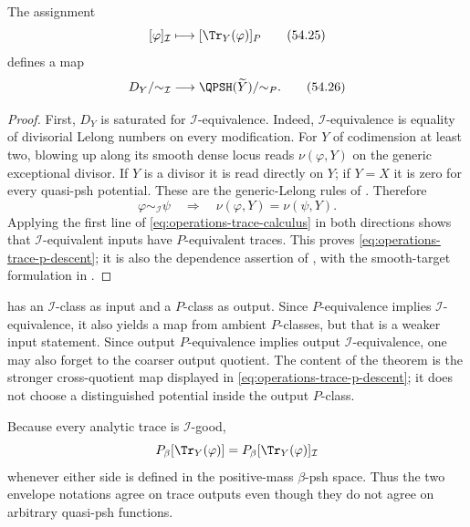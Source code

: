 \begin{theorem}\label{thm:operations-trace-p-descent}
The assignment
\[
 [\varphi]_{\mathcal I}\longmapsto
 [\Tr_Y(\varphi)]_P
\tag{54.25}\label{eq:operations-trace-p-map}
\]
defines a map
\[
 D_Y/{\sim_{\mathcal I}}
 \longrightarrow
 \QPSH(\widetilde Y)/{\sim_P}.
\tag{54.26}\label{eq:operations-trace-p-descent}
\]
\end{theorem}

\begin{proof}
First, $D_Y$ is saturated for $\mathcal I$-equivalence.  Indeed,
$\mathcal I$-equivalence is equality of divisorial Lelong numbers on
every modification.  For $Y$ of codimension at least two, blowing up
along its smooth dense locus reads $\nu(\varphi,Y)$ on the generic
exceptional divisor.  If $Y$ is a divisor it is read directly on $Y$;
if $Y=X$ it is zero for every quasi-psh potential.
These are the generic-Lelong rules of
.  Therefore
\[
 \varphi\sim_{\mathcal I}\psi
 \quad\Longrightarrow\quad
 \nu(\varphi,Y)=\nu(\psi,Y).
\tag{54.27}\label{eq:operations-domain-saturated}
\]
Applying the first line of \eqref{eq:operations-trace-calculus} in both
directions shows that $\mathcal I$-equivalent inputs have
$P$-equivalent traces.  This proves
\eqref{eq:operations-trace-p-descent}; it is also the dependence assertion
of \cite[Proposition~8.2.1]{XiaBook}, with the smooth-target
formulation in \cite[Lemma~3.9(i)]{DXTraceV2}.
\end{proof}

\begin{remark}
\label{rem:operations-trace-p-boundary}
 has an
$\mathcal I$-class as input and a $P$-class as output.  Since
$P$-equivalence implies $\mathcal I$-equivalence, it also yields a map
from ambient $P$-classes, but that is a weaker input statement.  Since
output $P$-equivalence implies output $\mathcal I$-equivalence, one may
also forget to the coarser output quotient.  The content of the theorem is
the stronger cross-quotient map displayed in
\eqref{eq:operations-trace-p-descent}; it does not choose a distinguished
potential inside the output $P$-class.
\end{remark}

Because every analytic trace is $\mathcal I$-good,
\[
 P_\beta[\Tr_Y(\varphi)]
 =P_\beta[\Tr_Y(\varphi)]_{\mathcal I}
\]
whenever either side is defined in the positive-mass
$\beta$-psh space.  Thus the two envelope notations agree on trace
outputs even though they do not agree on arbitrary quasi-psh functions.

